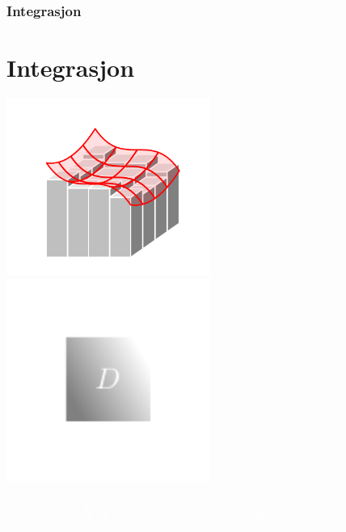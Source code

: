 {%
  \begin{frame}
  \frametitle{\bfseries Integrasjon}
  \section{Integrasjon}
  \begin{center}
    \includegraphics[width=0.5\textwidth]{../img/3d-dobbelintegral}%
    \includegraphics[width=0.5\textwidth]{../img/massetetthet}
  \end{center}
  \begin{equation*}
    \color{white}
    \iint_D \int_0^{f(x,y)} 1 \dz \dd(x,y)
    \qquad  = \qquad  \iint_{D} f(x,y) \dd (x,y)
  \end{equation*}
  \end{frame}%
}

